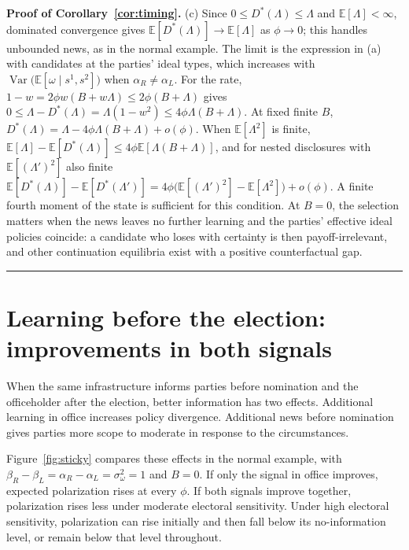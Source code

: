 \documentclass[12pt,letterpaper]{article}
\newenvironment{proof}[1][Proof]{\noindent\textbf{#1.} }{\ \rule{0.5em}{0.5em}}
\begin{document}
\begin{proof}[Proof of Corollary~\ref{cor:timing}]
(c) Since $0\le D^*(\Lambda)\le\Lambda$ and $\mathbb{E}[\Lambda]<\infty$, dominated convergence gives $\mathbb{E}[D^*(\Lambda)]\to\mathbb{E}[\Lambda]$ as $\phi\to0$; this handles unbounded news, as in the normal example. The limit is the expression in (a) with candidates at the parties' ideal types, which increases with $\operatorname{Var}\big(\mathbb{E}[\omega\mid s^1,s^2]\big)$ when $\alpha_R\ne\alpha_L$. For the rate, $1-w=2\phi w(B+w\Lambda)\le2\phi(B+\Lambda)$ gives $0\le\Lambda-D^*(\Lambda)=\Lambda(1-w^2)\le4\phi\Lambda(B+\Lambda)$. At fixed finite $B$, $D^*(\Lambda)=\Lambda-4\phi\Lambda(B+\Lambda)+o(\phi)$. When $\mathbb{E}[\Lambda^2]$ is finite, $\mathbb{E}[\Lambda]-\mathbb{E}[D^*(\Lambda)]\le4\phi\mathbb{E}[\Lambda(B+\Lambda)]$, and for nested disclosures with $\mathbb{E}[(\Lambda')^2]$ also finite $\mathbb{E}[D^*(\Lambda)]-\mathbb{E}[D^*(\Lambda')]=4\phi\big(\mathbb{E}[(\Lambda')^2]-\mathbb{E}[\Lambda^2]\big)+o(\phi)$. A finite fourth moment of the state is sufficient for this condition. At $B=0$, the selection matters when the news leaves no further learning and the parties' effective ideal policies coincide: a candidate who loses with certainty is then payoff-irrelevant, and other continuation equilibria exist with a positive counterfactual gap.
\end{proof}

\section{Learning before the election: improvements in both signals}
When the same infrastructure informs parties before nomination and the officeholder after the election, better information has two effects. Additional learning in office increases policy divergence. Additional news before nomination gives parties more scope to moderate in response to the circumstances.

Figure~\ref{fig:sticky} compares these effects in the normal example, with $\beta_R-\beta_L=\alpha_R-\alpha_L=\sigma_\omega^2=1$ and $B=0$. If only the signal in office improves, expected polarization rises at every $\phi$. If both signals improve together, polarization rises less under moderate electoral sensitivity. Under high electoral sensitivity, polarization can rise initially and then fall below its no-information level, or remain below that level throughout.
\end{document}
